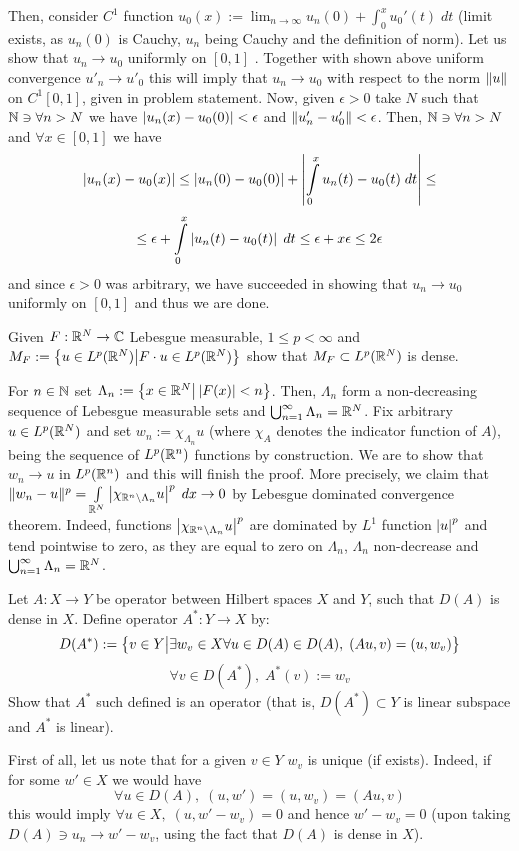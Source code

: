 \documentclass[10pt]{article} %
\begin{document}
Then, consider $C^1$ function $u_0(x):=\lim_{n\to\infty}u_n(0)+\int_0^xu_0'(t)\;dt$ (limit exists, as $u_n(0)$ is Cauchy, $u_n$ being
Cauchy and the definition of norm). Let us show that $u_n\to u_0$ uniformly on $[0,1]$
. Together with shown above uniform convergence
$u'_n\to u'_0$ this will imply that $u_n\to u_0$ with respect to the norm $\|u\|$ on $C^1[0,1]$, given in problem statement.
Now, given $\epsilon>0$ take $N$ such that $\mathbb{N}\ni\forall n>N$ we have $\left|u_n(x)-u_0(0)\right|<\epsilon$ and
$\|u_n'-u'_0\|<\epsilon$. Then, $\mathbb{N}\ni\forall n>N$ and $\forall x\in[0,1]$ we have
\[\myabs{u_n(x)-u_0(x)}\leq\myabs{u_n(0)-u_0(0)}+\myabs{\int_0^xu_n(t)-u_0(t)\;dt}\leq\]
\[\leq\epsilon+\int_0^x\myabs{u_n(t)-u_0(t)}\;dt\leq\epsilon+x\epsilon\leq2\epsilon\]
and since $\epsilon>0$ was arbitrary, we have succeeded in showing that $u_n\to u_0$ uniformly on $[0,1]$ and thus we are done.
\begin{myprob}[Oct 29]Given $F:\mathbb{R}^N\to\mathbb{C}$ Lebesgue measurable, $1\leq p<\infty$ and 
$M_F:=\left\{u\in L^p(\mathbb{R}^N)\big| F\cdot u\in L^p(\mathbb{R}^N)\right\}$ show that $M_F\subset L^p(\mathbb{R}^N)$ is dense.
\end{myprob}
For $n\in\mathbb{N}$ set $\Lambda_n:=\left\{x\in\mathbb{R}^N\big| \left|F(x)\right|<n\right\}$. Then, $\Lambda_n$ form a non-decreasing sequence
of Lebesgue 
measurable sets and $\bigcup_{n=1}^\infty\Lambda_n=\mathbb{R}^N$. Fix arbitrary $u\in L^p(\mathbb{R}^N)$ and set $w_n:=\chi_{\Lambda_n}u$
(where $\chi_A$ denotes the indicator function of $A$), being the sequence of $L^p(\mathbb{R}^n)$ functions by construction.
We are to show that $w_n\to u$ in $L^p(\mathbb{R}^n)$ and this will finish the proof. More precisely, we claim that
$\mynorm{w_n-u}^p=\int_{\R^N}\myabs{\chi_{\R^n\setminus\Lambda_n}u}^p\;dx\to0$ by Lebesgue dominated convergence theorem. Indeed,
functions $\left|\chi_{\mathbb{R}^n\setminus\Lambda_n}u\right|^p$ are dominated by $L^1$ function $\left|u\right|^p$ and tend pointwise to
zero, as they are equal to zero on $\Lambda_n$, $\Lambda_n$ non-decrease and $\bigcup_{n=1}^\infty\Lambda_n=\mathbb{R}^N$.
\begin{myprob}Let $A:X\to Y$
 be operator between Hilbert spaces $X$ and $Y$, such that $D(A)$ is dense in $X$. Define operator $A^*:Y\to X$ by:
\[D(A^*):=\left\{v\in Y\big| \exists w_v\in X\forall u\in D(A)\in D(A),\;(Au,v)=(u,w_v)\right\}\]
\[\forall v\in D(A^*),\;A^*(v):=w_v\]
Show that $A^*$ such defined is an operator (that is, $D(A^*)\subset Y$ is linear subspace and $A^*$ is linear).
\end{myprob}
First of all, let us note that for a given $v\in Y$ $w_v$ is unique (if exists). Indeed, if for some $w'\in X$ we would have
\[\forall u\in D(A),\; (u,w')=(u,w_v)=(Au,v)\]
this would imply $\forall u\in X,\;(u,w'-w_v)=0$ and hence $w'-w_v=0$ (upon taking $D(A)\ni u_n\to w'-w_v$, using the fact
that $D(A)$ is dense in $X$).
\end{document}
